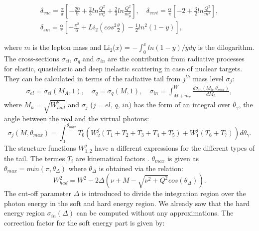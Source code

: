 \begin{equation}
  \begin{split}
    \delta_{vac} = \frac{\alpha}{\pi}\left[-\frac{20}{9}+\frac{2}{3}ln \frac{Q^2}{m_e^2}+\frac{2}{3}ln \frac{Q^2}{m^2_{\mu}}\right], \quad
    \delta_{vert} = \frac{\alpha}{\pi}\left[-2+\frac{3}{2}ln \frac{Q^2}{m^2}\right], \\
    \delta_{sm} = \frac{\alpha}{\pi}\left[-\frac{\pi^2}{6}+Li_2\left(cos^2 \frac{\theta}{2}\right)- \frac{1}{2}ln^2(1-y)\right],
  \end{split}
\end{equation}

where $m$ is the lepton mass and Li$_2$($x$) = $-\int_0^x ln(1-y)/y dy$ is the dilogarithm. The cross-sections $\sigma_{el}$, $\sigma_q$ and $\sigma_{in}$ are the contribution from radiative processes for elastic, quasielastic and deep inelastic scattering in case of nuclear targets. They can be calculated in terms of the radiative tail from $j^{th}$ mass level $\sigma_j$:
%
\begin{equation}
  \begin{split}
    \sigma_{el} = \sigma_{el}(M_A,1), \quad
    \sigma_{q} = \sigma_{q}(M,1), \quad
    \sigma_{in} = \int_{M+m_{\pi}}^W \frac{d\sigma_{in}(M_h,\theta_{max})}{dM_h},
  \end{split}
\end{equation}
%
where $M_h=\sqrt{W^2_{had}}$ and $\sigma_j$ ($j=el,\,q,\,in$) has the form of an integral over $\theta_{\gamma}$, the angle between the real and the virtual photons:
%
\begin{equation}
  \sigma_j(M,\theta_{max}) = \int_0^{\theta_{max}} T_0(W^j_2(T_1+T_2+T_3+T_4+T_5)+W^j_1(T_6+T_7))d\theta_{\gamma}.
\end{equation}
%
The structure functions $W^j_{1,2}$ have a different expressions for the different types of the tail. The termes $T_i$ are kinematical factors \cite{MoTsai}. $\theta_{max}$ is given as $\theta_{max} = min(\pi,\theta_{\Delta})$ where $\theta_{\Delta}$ is obtained via the relation:
%
\begin{equation}
  W^2_{had} = W^2 - 2\Delta(\nu+M-\sqrt{\nu^2+Q^2}cos(\theta_{\Delta})).
\end{equation}
%
The cut-off parameter $\Delta$ is introduced to divide the integration region over the photon energy in the soft and hard energy region. We already saw that the hard energy region $\sigma_{in}(\Delta)$ can be computed without any approximations. The correction factor for the soft energy part is given by:
